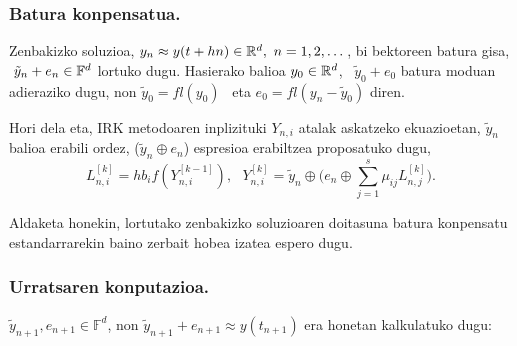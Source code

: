 \subsubsection*{Batura konpensatua.}

Zenbakizko soluzioa, $y_n \approx y(t+hn) \in \mathbb{R}^{d}, \ n=1,2,\dots$, bi bektoreen batura gisa, $ \ \tilde{y}_n+e_n \in \mathbb{F}^{d}$ lortuko dugu. Hasierako balioa $y_0 \in \mathbb{R}^{d}$, \ $\tilde{y}_0+e_0$ batura moduan adieraziko dugu, non $\tilde{y}_0=fl(y_0)$~ eta $e_0=fl(y_n-\tilde{y}_0)$ diren. 

Hori dela eta, IRK metodoaren inplizituki $Y_{n,i}$ atalak askatzeko ekuazioetan, $\tilde {y}_n$ balioa erabili ordez, ($\tilde{y}_n \oplus e_{n}$) espresioa erabiltzea proposatuko dugu, 
\begin{equation}
\label{eq:eqbk}
L_{n,i}^{[k]}=hb_if(Y_{n,i}^{[k-1]}), \ \ \ Y_{n,i}^{[k]}=\tilde{y}_n \oplus \big(e_{n} \oplus \sum\limits_{j=1}^{s} \mu_{ij} L_{n,j}^{[k]}\big).
\end{equation}

Aldaketa honekin, lortutako zenbakizko soluzioaren doitasuna batura konpensatu estandarrarekin baino zerbait hobea izatea espero dugu. 

\subsubsection*{Urratsaren konputazioa.}

$\tilde{y}_{n+1}, e_{n+1} \in \mathbb{F}^d$, non $\tilde{y}_{n+1}+e_{n+1}\approx y(t_{n+1})$ era honetan kalkulatuko dugu:

